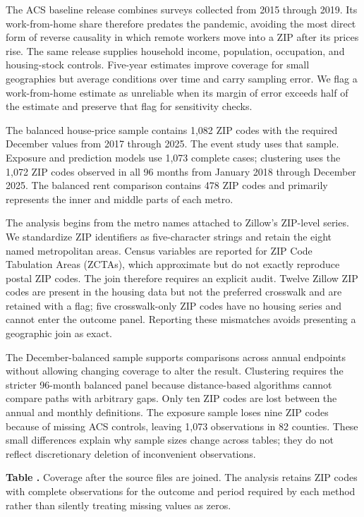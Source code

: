 \documentclass[11pt]{article}
\newcounter{tabnum}
\newcommand{\tab}[3]{%
  \begin{table}[!htbp]\centering
  \refstepcounter{tabnum}\label{#2}%
  {\small\raggedright\textbf{Table \thetabnum.} #3\par}\vspace{3pt}
  
  \end{table}}
\begin{document}
The ACS baseline release combines surveys collected from 2015 through 2019. Its work-from-home share therefore predates the
pandemic, avoiding the most direct form of reverse causality in which remote workers move into a ZIP after its prices rise. The
same release supplies household income, population, occupation, and housing-stock controls. Five-year estimates improve coverage
for small geographies but average conditions over time and carry sampling error. We flag a work-from-home estimate as unreliable
when its margin of error exceeds half of the estimate and preserve that flag for sensitivity checks.

The balanced house-price sample contains 1,082 ZIP codes with the required December values from 2017 through 2025. The event study
uses that sample. Exposure and prediction models use 1,073 complete cases; clustering uses the 1,072 ZIP codes observed in all 96
months from January 2018 through December 2025. The balanced rent comparison contains 478 ZIP codes and primarily represents the
inner and middle parts of each metro.

The analysis begins from the metro names attached to Zillow's ZIP-level series. We standardize ZIP identifiers as five-character
strings and retain the eight named metropolitan areas. Census variables are reported for ZIP Code Tabulation Areas (ZCTAs), which
approximate but do not exactly reproduce postal ZIP codes. The join therefore requires an explicit audit. Twelve Zillow ZIP codes
are present in the housing data but not the preferred crosswalk and are retained with a flag; five crosswalk-only ZIP codes have no
housing series and cannot enter the outcome panel. Reporting these mismatches avoids presenting a geographic join as exact.

The December-balanced sample supports comparisons across annual endpoints without allowing changing coverage to alter the result.
Clustering requires the stricter 96-month balanced panel because distance-based algorithms cannot compare paths with arbitrary
gaps. Only ten ZIP codes are lost between the annual and monthly definitions. The exposure sample loses nine ZIP codes because of
missing ACS controls, leaving 1,073 observations in 82 counties. These small differences explain why sample sizes change across
tables; they do not reflect discretionary deletion of inconvenient observations.

\tab{t_coverage}{tab:coverage}{Coverage after the source files are joined. The analysis retains ZIP codes with complete observations
for the outcome and period required by each method rather than silently treating missing values as zeros.}
\end{document}
